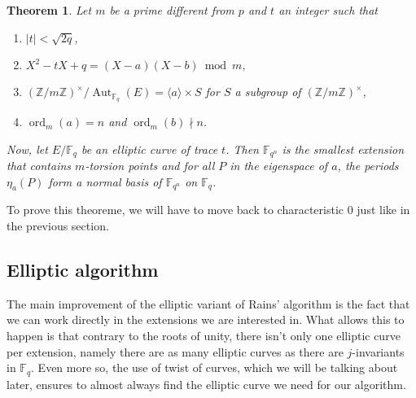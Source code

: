 \documentclass[12pt]{article}
\theoremstyle{plain}
\newtheorem{theorem}{Theorem}
\theoremstyle{definition}
\DeclareMathOperator{\order}{ord} %
\DeclareMathOperator{\Aut}{Aut}
\def\Z{\ensuremath{\mathbb{Z}}}
\def\F{\ensuremath{\mathbb{F}}}
\newcounter{algorithm}
\begin{document}
\begin{theorem}
\label{theorem:ellperiods}
Let $m$ be a prime different from $p$ and $t$ an integer such that 

\begin{enumerate}

    \item $\mid t\mid < \sqrt{2q}$,
    \item $X^2 - tX + q = (X - a)(X - b)\bmod m,$
    \item $(\Z/m\Z)^{\times}/\Aut_{\F_q}(E) = \langle{a}\rangle \times S$ for $S$ a subgroup of
$(\Z/m\Z)^{\times}$,
    \item $\order_m(a) = n$ and $\order_m(b) \nmid n$.
\end{enumerate}
Now, let $E/\F_q$ be an elliptic curve of trace $t$. Then $\F_{q^n}$ is the
smallest extension that contains $m$-torsion points and for all $P$ in the
eigenspace of $a$, the periods $\eta_a(P)$ form a normal basis of $\F_{q^n}$ on
$\F_q$.

\end{theorem}

To prove this theoreme, we will have to move back to characteristic $0$ just
like in the previous section.

\subsection{Elliptic algorithm}

The main improvement of the elliptic variant of Rains' algorithm is the fact
that we can work directly in the extensions we are interested in. What allows
this to happen is that contrary to the roots of unity, there isn't only one
elliptic curve per extension, namely there are as many elliptic curves as there
are $j$-invariants in $\F_q$. Even more so, the use of twist of curves, which we
will be talking about later, ensures to almost always find the elliptic curve we
need for our algorithm.\\\par
\end{document}
